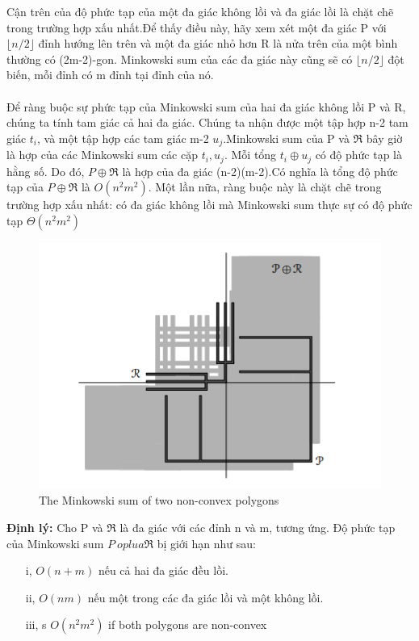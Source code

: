 \documentclass[a4paper,12pt]{report}
\begin{document}
Cận trên của độ phức tạp của một đa giác không lồi và đa giác lồi là chặt chẽ trong trường hợp xấu nhất.Để thấy điều này, hãy xem xét một đa giác P với $\lfloor n/2 \rfloor$ đỉnh hướng lên trên và một đa giác nhỏ hơn R là nửa trên của một bình thường có (2m-2)-gon. Minkowski sum của các đa giác này cũng sẽ có $\lfloor n/2 \rfloor$ đột biến, mỗi đỉnh có m đỉnh tại đỉnh của nó. \\ \\
Để ràng buộc sự phức tạp của Minkowski sum của hai đa giác không lồi P và R, chúng ta tính tam giác cả hai đa giác. Chúng ta nhận được một tập hợp n-2 tam giác $t_i$, và một tập hợp các tam giác m-2 $u_j$.Minkowski sum của P và $\Re$ bây giờ là hợp của các Minkowski sum các cặp $t_i, u_j$. Mỗi tổng $t_i \oplus u_j$ có độ phức tạp là hằng số. Do đó, $P \oplus \Re$ là hợp của đa giác (n-2)(m-2).Có nghĩa là tổng độ phức tạp của $P \oplus \Re$ là $O(n^2m^2)$. Một lần nữa, ràng buộc này là chặt chẽ trong trường hợp xấu nhất: có đa giác không lồi mà Minkowski sum thực sự có độ phức tạp $\Theta(n^2m^2)$ \\
\begin{figure}[H]
\centering
\includegraphics[width=0.6\linewidth]{11.png}
\caption{The Minkowski sum of two non-convex polygons}
\end{figure}
\textbf{Định lý:} Cho P và $\Re$ là đa giác với các đỉnh n và m, tương ứng. Độ phức tạp của Minkowski sum $P\ oplua \Re$ bị giới hạn như sau:
\begin{itemize}
\item[i, ] $O(n+m)$ nếu cả hai đa giác đều lồi.
\item[ii, ] $O(nm)$ nếu một trong các đa giác lồi và một không lồi.
\item[iii, ] s $O(n^2m^2)$ if both polygons are non-convex
\end{itemize}
\end{document}
